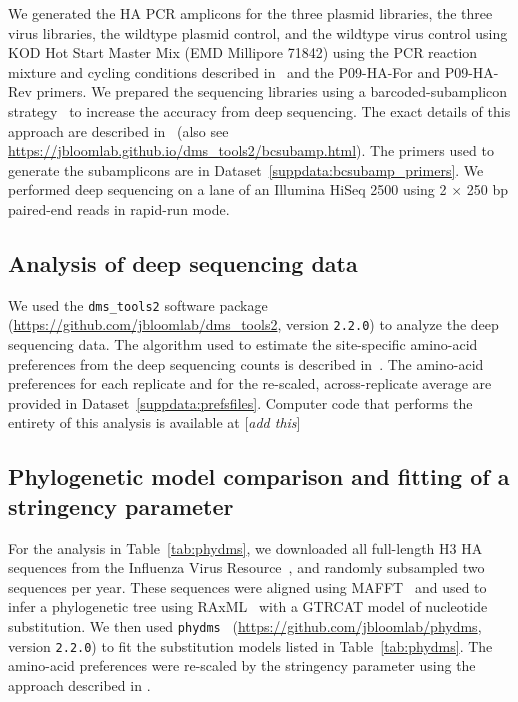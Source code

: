 \documentclass[9pt,twocolumn,twoside]{pnas-new}
\newcommand{\comment}[1]{{\color{red}[\textsl{#1}]}}
\begin{document}
{We generated the HA PCR amplicons for the three plasmid libraries, the three virus libraries, the wildtype plasmid control, and the wildtype virus control using KOD Hot Start Master Mix (EMD Millipore 71842) using the PCR reaction mixture and cycling conditions described in~\cite{bloom2014experimentally} and the P09-HA-For and P09-HA-Rev primers.
We prepared the sequencing libraries using a barcoded-subamplicon strategy~\cite{wu2014high} to increase the accuracy from deep sequencing. 
The exact details of this approach are described in~\cite{doud2016accurate} (also see \url{https://jbloomlab.github.io/dms_tools2/bcsubamp.html}).
The primers used to generate the subamplicons are in Dataset~\ref{suppdata:bcsubamp_primers}.
We performed deep sequencing on a lane of an Illumina HiSeq 2500 using 2 $\times$ 250 bp paired-end reads in rapid-run mode.

\subsection*{Analysis of deep sequencing data}
We used the \texttt{dms\_tools2} software package~\cite{bloom2015software} (\url{https://github.com/jbloomlab/dms_tools2}, version \texttt{2.2.0}) to analyze the deep sequencing data.
The algorithm used to estimate the site-specific amino-acid preferences from the deep sequencing counts is described in~\cite{bloom2015software}.
The amino-acid preferences for each replicate and for the re-scaled, across-replicate average are provided in Dataset~\ref{suppdata:prefsfiles}.
Computer code that performs the entirety of this analysis is available at \comment{add this}

\subsection*{Phylogenetic model comparison and fitting of a stringency parameter}
For the analysis in Table~\ref{tab:phydms}, we downloaded all full-length H3 HA sequences from the Influenza Virus Resource~\cite{bao2008}, and randomly subsampled two sequences per year.
These sequences were aligned using MAFFT~\cite{katoh2013mafft} and used to infer a phylogenetic tree using RAxML~\cite{stamatakis2006raxml} with a GTRCAT model of nucleotide substitution.
We then used \texttt{phydms}~\cite{hilton2017phydms} (\url{https://github.com/jbloomlab/phydms}, version \texttt{2.2.0}) to fit the substitution models listed in Table~\ref{tab:phydms}.
The amino-acid preferences were re-scaled by the stringency parameter using the approach described in \cite{hilton2017phydms}.

}
\end{document}
